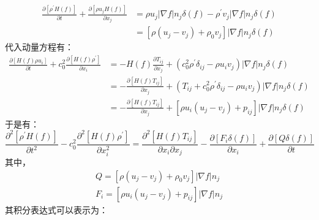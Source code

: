 \begin{enumerate}
\begin{equation}
\begin{aligned}
                \frac{\partial\left[\rho^{\prime} H(f)\right]}{\partial t}+\frac{\partial\left[\rho u_{j} H(f)\right]}{\partial x_{j}} 
                &=\rho u_{j} |\nabla f| n_{j} \delta(f)-\rho^{\prime} v_{j} |\nabla f| n_{j} \delta(f) \\
                &=\left[\rho\left(u_{j}-v_{j}\right)+\rho_{0} v_{j}\right] |\nabla f| n_{j} \delta(f)
            \end{aligned}
        \end{equation}
        代入动量方程有：
        \begin{equation}
            \begin{aligned}
                \frac{\partial\left[H(f) \rho u_{i}\right]}{\partial t}+c_{0}^{2} \frac{\partial\left[H(f) \rho^{\prime}\right]}{\partial x_{i}} 
                &=-H(f) \frac{\partial T_{i j}}{\partial x_{j}}+\left(c_{0}^{2} \rho^{\prime} \delta_{i j}-\rho u_{i} v_{j}\right) |\nabla f| n_{j} \delta(f) \\
                &=-\frac{\partial\left[H(f) T_{i j}\right]}{\partial x_{j}}+\left(T_{i j}+c_{0}^{2} \rho^{\prime} \delta_{i j}-\rho u_{i} v_{j}\right) |\nabla f| n_{j} \delta(f) \\
                &=-\frac{\partial\left[H(f) T_{i j}\right]}{\partial x_{j}}+\left[\rho u_{i}\left(u_{j}-v_{j}\right)+p_{i j}\right] |\nabla f| n_{j} \delta(f)
            \end{aligned}
        \end{equation}
        于是有：
        \begin{equation}
            \frac{\partial^{2}\left[\rho^{\prime} H(f)\right]}{\partial t^{2}}-c_{0}^{2} \frac{\partial^{2}\left[H(f) \rho^{\prime}\right]}{\partial x_{i}^{2}}
            =\frac{\partial^{2}\left[H(f) T_{i j}\right]}{\partial x_{i} \partial x_{j}}-\frac{\partial\left[F_{i} \delta(f)\right]}{\partial x_{i}}+\frac{\partial[Q \delta(f)]}{\partial t}
        \end{equation}
        其中，
        \begin{equation*}
            \begin{aligned}
                Q=\left[\rho\left(u_{j}-v_{j}\right)+\rho_{0} v_{j}\right] |\nabla f| n_{j} \\
                F_{i}=\left[\rho u_{i}\left(u_{j}-v_{j}\right)+p_{i j}\right] |\nabla f| n_{j}
            \end{aligned}
        \end{equation*}
        其积分表达式可以表示为：
        \begin{equation}

\end{equation}
\end{enumerate}
